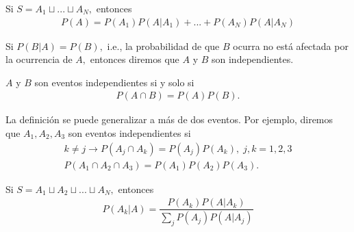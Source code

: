 {}
\begin{teorema}
	\label{thm:1.10} Si $S=A_{1}\sqcup ... \sqcup A_{N},$  entonces
	\begin{align}
		\label{1.20}
		P(A)=P(A_{1})P(A|A_{1})+...+P(A_{N})P(A|A_{N})
	\end{align}
\end{teorema}


{}
Si $P(B|A)=P(B),$ i.e., la probabilidad de que $B$ ocurra no está afectada por la ocurrencia de $A,$ entonces diremos que $A$ y $B$ son independientes.


\begin{definicion}
	$A$ y $B$ son eventos independientes si y solo si
	\begin{align}
		\label{1.21}
		P(A \cap B) = P(A)P(B).
	\end{align}
\end{definicion}


{}
La definición se puede generalizar a más de dos eventos.  Por ejemplo, diremos que $A_{1},A_{2},A_{3}$ son eventos independientes si
\begin{align}
	k\neq j \rightarrow P(A_{j} \cap A_{k})=P(A_{j})P(A_{k}), \; j,k=1,2,3 
	\\ P(A_{1}\cap A_{2} \cap A_{3})=P(A_{1})P(A_{2})P(A_{3}).
\end{align}


\begin{teorema}
	Si $S=A_{1}\sqcup A_{2} \sqcup...\sqcup A_{N},$ entonces
	\begin{align}
		\label{1.24}
		P(A_{k}|A) = \dfrac{P(A_{k})P(A|A_{k})}{\sum_{j} P(A_{j})P(A|A_{j})}
	\end{align}
	
\end{teorema}




